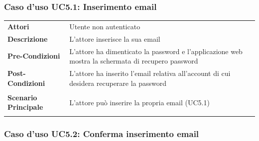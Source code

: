\subsubsection{Caso d'uso UC5.1: Inserimento email}
\label{UC5_1}

\begin{minipage}{\linewidth}
\begin{longtable}{ l | p{11cm}}
	\hline
	\rowcolor{Gray}
	 \multicolumn{2}{c}{UC5.1 - Inserimento email} \\
	 \hline
	\textbf{Attori} & Utente non autenticato \\
	\textbf{Descrizione} & L'attore inserisce la sua email \\
	\textbf{Pre-Condizioni} & L'attore ha dimenticato la password e l'applicazione web mostra la schermata di recupero password \\
	\textbf{Post-Condizioni} & L'attore ha inserito l'email relativa all'account di cui desidera recuperare la password \\
	\textbf{Scenario Principale} & \begin{enumerate*}[label=(\arabic*.),itemjoin={\newline}]
		\item L'attore può inserire la propria email (UC5.1)
	\end{enumerate*}\\
\end{longtable}
\end{minipage}

\subsubsection{Caso d'uso UC5.2: Conferma inserimento email}
\label{UC5_2}

